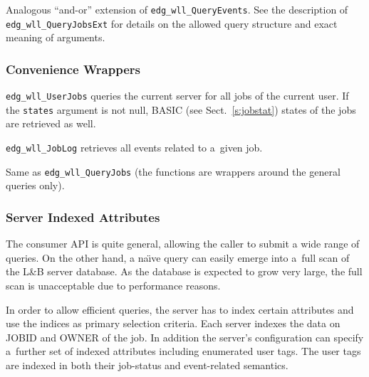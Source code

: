 \documentclass{egee}
\def\LB{L\&B\xspace}
\begin{document}
\Description
\begin{sloppypar}
Analogous ``and-or'' extension of \verb'edg_wll_QueryEvents'.
See the description of \verb'edg_wll_QueryJobsExt' for details
on the allowed query structure and exact meaning of arguments.
\end{sloppypar}

\subsubsection{Convenience Wrappers}

\Synopsis
{}


\Description
\verb'edg_wll_UserJobs' queries the current server for all jobs of the
current user.
If the \verb'states' argument is not null, BASIC (see Sect.~\ref{s:jobstat})
states of the jobs are retrieved as well.

\verb'edg_wll_JobLog' retrieves all events related to a~given job.

\Return
Same as \verb'edg_wll_QueryJobs' (the functions are wrappers around
the general queries only).

\subsubsection{Server Indexed Attributes}
\label{s:index}
The consumer API is quite general, allowing the caller to submit
a wide range of queries.
On the other hand,
a na\"\i ve query can easily emerge into a~full scan of the \LB server
database. As the database is expected to grow very large, the full scan
is unacceptable due to performance reasons.

In order to allow efficient queries, the server has to index certain attributes
and use the indices as primary selection criteria.
Each server indexes the data on JOBID and OWNER of the job.
In addition the
server's configuration can specify a~further set of indexed attributes
including enumerated user tags.
The user tags are indexed in both their job-status and event-related semantics.
\end{document}
